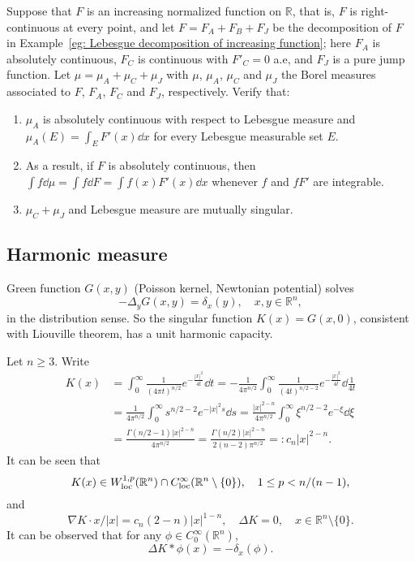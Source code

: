 \begin{example}
  Suppose that $F$ is an increasing normalized function on $\mathbb R$,
  that is, $F$ is right-continuous at every point,
  and let $F = F_A + F_B + F_J$ be the decomposition of $F$ in Example~\ref*{eg: Lebesgue decomposition of increasing function};
  here $F_A$ is absolutely continuous, $F_C$ is continuous with $F'_C = 0$ a.e, and $F_J$ is a pure jump function.
  Let $\mu = \mu_A + \mu_C + \mu_J$ with $\mu$, $\mu_A$, $\mu_C$ and $\mu_J$ the Borel measures associated to $F$, $F_A$, $F_C$ and $F_J$, respectively.
  Verify that:
  \begin{enumerate}
    \item $\mu_A$ is absolutely continuous with respect to Lebesgue measure and $\mu_A(E) = \int_EF'(x)\dd x$ for every Lebesgue measurable set $E$.
    \item As a result, if $F$ is absolutely continuous, then $\int f\dd\mu = \int f\dd F = \int f(x)F'(x)\dd x$ whenever $f$ and $fF'$ are integrable.
    \item $\mu_C + \mu_J$ and Lebesgue measure are mutually singular.
  \end{enumerate}
\end{example}


\subsection{Harmonic measure}

Green function $G(x,y)$ (Poisson kernel, Newtonian potential) solves 
\[
-\Delta_y G(x,y) = \delta_x(y), \quad x,y\in\mathbb R^n,
\]
in the distribution sense. 
So the singular function $K(x) = G(x,0)$, consistent with Liouville theorem,
has a unit harmonic capacity.

\begin{proposition}
  Let $n\geq3$. 
  Write
  \begin{align*}
    K(x) &= \int_0^\infty\frac{1}{(4\pi t)^{n/2}}e^{-\frac{|x|^2}{4t}}\dd t 
    = - \frac{1}{4\pi^{n/2}}\int_0^\infty\frac{1}{(4t)^{n/2-2}}e^{-\frac{|x|^2}{4t}}\dd\frac1{4t}\\
    &= \frac1{4\pi^{n/2}}\int_0^\infty s^{n/2-2}e^{-|x|^2s}\dd s
    = \frac{|x|^{2-n}}{4\pi^{n/2}}\int_0^\infty \xi^{n/2-2}e^{-\xi}\dd\xi \\
    &= \frac{\Gamma(n/2-1)|x|^{2-n}}{4\pi^{n/2}} = \frac{\Gamma(n/2)|x|^{2-n}}{2(n-2)\pi^{n/2}} =: c_n|x|^{2-n}.
  \end{align*}
  It can be seen that 
  \[
  K(x) \in W_{\operatorname*{loc}}^{1,p}(\mathbb R^n)\cap C_{\operatorname*{loc}}^\infty(\mathbb R^n\setminus \{0\}),
  \quad 1\leq p < n/(n-1),
  \]
  and 
  \[
  \nabla K\cdot x/|x| = c_n(2-n)|x|^{1-n},\quad \Delta K = 0, \quad x\in  \mathbb R^n\setminus\{0\}.
  \]
  It can be observed that for any $\phi\in C_0^\infty(\mathbb R^n)$,
  \[
  \Delta K*\phi (x) = -\delta_x(\phi).
  \]
\end{proposition}

